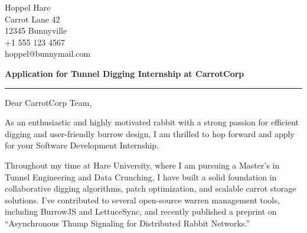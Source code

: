 \documentclass[
11pt, %
]{letter}
\begin{document}
	
	
	
	\medskip %
	
	
	\begingroup
	\raggedleft %
	Hoppel Hare \\ %
	Carrot Lane 42 \\ %
	12345 Bunnyville \\
	+1 555 123 4567 \\ %
	hoppel@bunnymail.com\\ %
	\endgroup
	
	
	\bigskip
	
	\bigskip %
	
	\textcolor{RubricTextColor}{\textbf{Application for Tunnel Digging Internship at CarrotCorp}} \\
	\textcolor{RubricTextColor}{\rule{\linewidth}{1pt}} %
	
	\medskip %
	
	Dear CarrotCorp Team,
	
	\smallskip %
	
	
	As an enthusiastic and highly motivated rabbit with a strong passion for efficient digging and user-friendly burrow design, I am thrilled to hop forward and apply for your Software Development Internship.
	
	Throughout my time at Hare University, where I am pursuing a Master’s in Tunnel Engineering and Data Crunching, I have built a solid foundation in collaborative digging algorithms, patch optimization, and scalable carrot storage solutions. I’ve contributed to several open-source warren management tools, including BurrowJS and LettuceSync, and recently published a preprint on “Asynchronous Thump Signaling for Distributed Rabbit Networks.”
	
\end{document}
